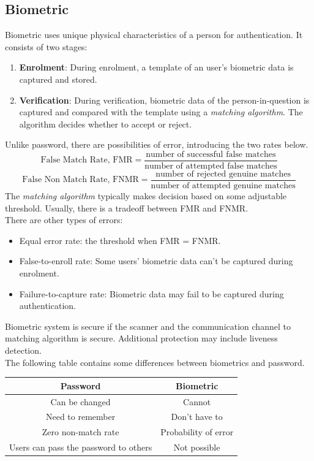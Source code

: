 \documentclass[12pt]{article}
\theoremstyle{definition}
\begin{document}
\subsection{Biometric}
Biometric uses unique physical characteristics of a person for authentication. It consists of two stages:
\begin{enumerate}
  \item \textbf{Enrolment}: During enrolment, a template of an user's biometric data is captured and stored.
  \item \textbf{Verification}: During verification, biometric data of the person-in-question is captured and compared with the template using a \textit{matching algorithm}. The algorithm decides whether to accept or reject.
\end{enumerate}
Unlike password, there are possibilities of error, introducing the two rates below.
\[
\text{False Match Rate, FMR}=\frac{\text{number of successful false matches}}{\text{number of attempted false matches}}
\]
\[
\text{False Non Match Rate, FNMR}= \frac{\text{number of rejected genuine matches}}{\text{number of attempted genuine matches}}
\]
The \textit{matching algorithm} typically makes decision based on some adjustable threshold. Usually, there is a tradeoff between FMR and FNMR.\\
There are other types of errors:
\begin{itemize}
  \item Equal error rate: the threshold when FMR = FNMR.
  \item False-to-enroll rate: Some users' biometric data can't be captured during enrolment.
  \item Failure-to-capture rate: Biometric data may fail to be captured during authentication.
\end{itemize}
Biometric system is secure if the scanner and the communication channel to matching algorithm is secure. Additional protection may include liveness detection.\\
The following table contains some differences between biometrics and password.
\begin{table}[h]
\centering
\begin{tabular}{|c|c|}
\hline
Password&Biometric\\\hline
Can be changed&Cannot\\\hline
Need to remember&Don't have to\\\hline
Zero non-match rate&Probability of error\\\hline
Users can pass the password to others&Not possible\\\hline
\end{tabular}
\end{table}
\end{document}
